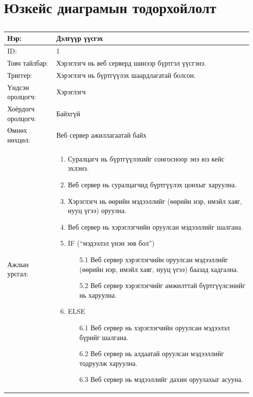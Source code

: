\section{Юзкейс диаграмын тодорхойлолт}

\begin{center}
	\begin{table}[!htbp]
		\caption{}
		\begin{tabular}{|p{4cm}|p{11cm}|}
		\hline
			Нэр: & Дэлгүүр үүсгэх \\
		\hline
			ID: & 1 \\
		\hline
			Товч тайлбар: & Хэрэглэгч нь веб серверд шинээр бүртгэл үүсгэнэ. \\
		\hline
			Триггер: & Хэрэглэгч нь бүртгүүлэх шаардлагатай болсон. \\
		\hline
			Үндсэн оролцогч: & Хэрэглэгч \\
		\hline
			Хоёрдогч оролцогч: & Байхгүй  \\
		\hline
			Өмнөх нөхцөл: &  Веб сервер ажиллагаатай байх\\
		\hline
			Ажлын урсгал: & \begin{enumerate}
						 	\item Суралцагч нь бүртгүүлэхийг сонгосноор энэ юз кейс эхлэнэ. 
						 	\item Веб сервер нь суралцагчид бүртгүүлэх цонхыг харуулна. 
						 	\item Хэрэглэгч нь өөрийн мэдээллийг (өөрийн нэр, имэйл хаяг, нууц үгээ) оруулна. 
						 	\item Веб сервер нь хэрэглэгчийн оруулсан мэдээллийг шалгана. 
						 	\item IF (“мэдээлэл үнэн зөв бол”)
							 	\begin{enumerate}
							 		\item[5.1] Веб сервер хэрэглэгчийн оруулсан мэдээллийг (өөрийн нэр, имэйл хаяг, нууц үгээ) баазад хадгална.
							 		\item[5.2] Веб сервер хэрэглэгчийг амжилттай бүртгүүлсэнийг нь харуулна. 
							 	\end{enumerate}
						 	\item ELSE
							 	\begin{enumerate}
							 		\item[6.1] Веб сервер нь хэрэглэгчийн оруулсан мэдээлэл бүрийг шалгана.  
							 		\item[6.2] Веб сервер нь алдаатай оруулсан мэдээллийг тодруулж харуулна. 
							 		\item[6.3] Веб сервер нь мэдээллийг дахин оруулахыг асууна. 

\end{enumerate}
\end{enumerate}
\end{tabular}
\end{table}
\end{center}
